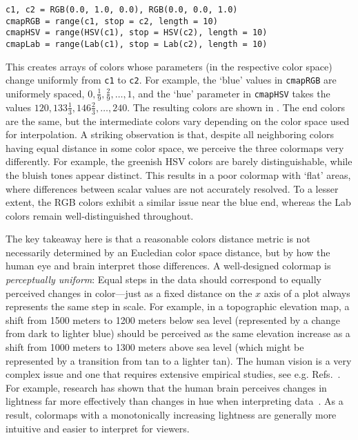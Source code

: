 \begin{lstlisting}
c1, c2 = RGB(0.0, 1.0, 0.0), RGB(0.0, 0.0, 1.0)
cmapRGB = range(c1, stop = c2, length = 10) 
cmapHSV = range(HSV(c1), stop = HSV(c2), length = 10) 
cmapLab = range(Lab(c1), stop = Lab(c2), length = 10) 
\end{lstlisting}

This creates arrays of colors whose parameters (in the respective color space) change uniformly from \verb|c1| to \verb|c2|. For example, the `blue' values in \verb|cmapRGB| are uniformely spaced, $0,\frac{1}{9},\frac{2}{9},\ldots,1$, and the `hue' parameter in \verb|cmapHSV| takes the values $120,133\frac{1}{3},146\frac{2}{3},\ldots,240$.
The resulting colors are shown in . 
The end colors are the same, but the intermediate colors vary depending on the color space used for interpolation. A striking observation is that, despite all neighboring colors having equal distance in some color space, we perceive the three colormaps very differently. For example, the greenish HSV colors are barely distinguishable, while the bluish tones appear distinct. This results in a poor colormap with `flat' areas, where differences between scalar values are not accurately resolved. To a lesser extent, the RGB colors exhibit a similar issue near the blue end, whereas the Lab colors remain well-distinguished throughout.

The key takeaway here is that a reasonable colors distance metric is not necessarily determined by an Eucledian color space distance, but by how the human eye and brain interpret those differences. A well-designed colormap is \emph{perceptually uniform}: Equal steps in the data should correspond to equally perceived changes in color---just as a fixed distance on the $x$ axis of a plot always represents the same step in scale. For example, in a topographic elevation map, a shift from 1500 meters to 1200 meters below sea level (represented by a change from dark to lighter blue) should be perceived as the same elevation increase as a shift from 1000 meters to 1300 meters above sea level (which might be represented by a transition from tan to a lighter tan).
The human vision is a very complex issue and one that requires extensive empirical studies, see e.g. Refs.~\cite{rogowitz1996,mullen1985,crameri2020}. For example, research has shown that the human brain perceives changes in lightness far more effectively than changes in hue when interpreting data~\cite{rogowitz1996}. As a result, colormaps with a monotonically increasing lightness are generally more intuitive and easier to interpret for viewers.

